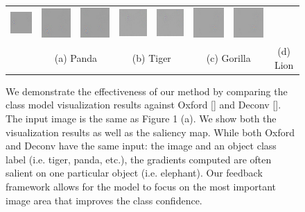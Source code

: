 \begin{figure}
\begin{center}
\begin{tabular}{ccccccccc}
\includegraphics[width=0.11\linewidth]{figs/visual_compare/saliency/feedback/panda} &
\includegraphics[width=0.11\linewidth]{figs/visual_compare/gradient/feedback/tiger} &
\includegraphics[width=0.11\linewidth]{figs/visual_compare/saliency/feedback/tiger} &
\includegraphics[width=0.11\linewidth]{figs/visual_compare/gradient/feedback/gorilla} &
\includegraphics[width=0.11\linewidth]{figs/visual_compare/saliency/feedback/gorilla} &
\includegraphics[width=0.11\linewidth]{figs/visual_compare/gradient/feedback/lion} &
\includegraphics[width=0.11\linewidth]{figs/visual_compare/saliency/feedback/lion} \\
&
\multicolumn{2}{c}{{\small (a) Panda}} &
\multicolumn{2}{c}{{\small (b) Tiger}} &
\multicolumn{2}{c}{{\small (c) Gorilla}} &
\multicolumn{2}{c}{{\small (d) Lion}} \\
\end{tabular}
\caption{We demonstrate the effectiveness of our method by comparing the class model visualization results against Oxford [] and Deconv []. The input image is the same as Figure 1 (a). We show both the visualization results as well as the saliency map. While both Oxford and Deconv have the same input: the image and an object class label (i.e. tiger, panda, etc.), the gradients computed are often salient on one particular object (i.e. elephant). Our feedback framework allows for the model to focus on the most important image area that improves the class confidence.}
\label{fig:visual_compare}
\end{center}
\end{figure}


